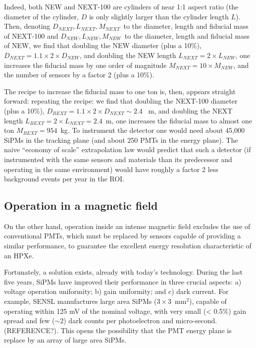 Indeed, both NEW and NEXT-100 are cylinders of near 1:1 aspect ratio (the diameter of the cylinder, $D$ is only slightly larger than the cylinder length $L$). Then, denoting $D_{NEXT}, L_{NEXT}, M_{NEXT}$~to the diameter, length and fiducial mass of NEXT-100 and $D_{NEW}, L_{NEW}, M_{NEW}$~to the diameter, length and fiducial mass of NEW, we find that doubling the NEW diameter (plus a 10\%), $D_{NEXT} = 1.1 \times 2 \times D_{NEW}$, and doubling the NEW length $L_{NEXT} = 2 \times L_{NEW}$, one increases the fiducial mass by one order of magnitude $M_{NEXT} = 10 \times M_{NEW}$, and the number of sensors by a factor 2 (plus a 10\%). 

The recipe to increase the fiducial mass to one ton is, then, appears straight forward: repeating the recipe:
we find that doubling the NEXT-100 diameter (plus a 10\%), $D_{BEXT} = 1.1 \times 2 \times D_{NEXT} \sim 2.4$~ m, and doubling the NEXT length $L_{BEXT} = 2 \times L_{NEXT} =2.4$~m, one increases the fiducial mass to almost one ton $M_{BEXT} = 954$~kg. To instrument the detector one would need about 45,000 SiPMs in the tracking plane (and about 250 PMTs in the energy plane). The naive ``economy of scale'' extrapolation law would predict that such a detector (if instrumented with the same sensors and materials than its predecessor and operating in the same environment) would have roughly a factor 2 less background events per year in the ROI.

\subsection{Operation in a magnetic field}
On the other hand, operation inside an intense magnetic field excludes the use of conventional PMTs, which must be replaced by sensors capable of providing a similar performance, to guarantee the excellent energy resolution characteristic of an HPXe.

Fortunately, a solution exists, already with today's technology. During the last five years, SiPMs have improved their performance in three crucial aspects: a) voltage operation uniformity; b) gain uniformity; and c) dark current.  
For example, SENSL manufactures large area SiPMs ($3 \times 3$~mm$^2$), capable of operating within 125 mV of the nominal voltage, with very small (< 0.5\%) gain spread and few ($\sim 2$) dark counts per photoelectron and micro-second. (REFERENCE?). This opens the possibility that the PMT energy plane is replace by an array of large area SiPMs. 

